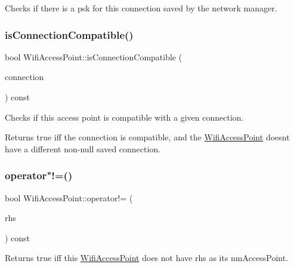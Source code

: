 Checks if there is a psk for this connection saved by the network manager. \mbox{\label{classWifiAccessPoint_ace8773ced0e39ecf90e5716e630cf066}} 
\subsubsection{\texorpdfstring{is\+Connection\+Compatible()}{isConnectionCompatible()}}
{\footnotesize\ttfamily bool Wifi\+Access\+Point\+::is\+Connection\+Compatible (\begin{DoxyParamCaption}\item[{N\+M\+Connection $\ast$}]{connection }\end{DoxyParamCaption}) const}

Checks if this access point is compatible with a given connection.

\begin{DoxyReturn}{Returns}
true iff the connection is compatible, and the \mbox{\hyperlink{classWifiAccessPoint}{Wifi\+Access\+Point}} doesn\textquotesingle{}t have a different non-\/null saved connection. 
\end{DoxyReturn}
\mbox{\label{classWifiAccessPoint_a966c77eedcf8093d7302a5803cbb345f}} 
\subsubsection{\texorpdfstring{operator"!=()}{operator!=()}\hspace{0.1cm}{\footnotesize\ttfamily [1/2]}}
{\footnotesize\ttfamily bool Wifi\+Access\+Point\+::operator!= (\begin{DoxyParamCaption}\item[{N\+M\+Access\+Point $\ast$}]{rhs }\end{DoxyParamCaption}) const}

Returns true iff this \mbox{\hyperlink{classWifiAccessPoint}{Wifi\+Access\+Point}} does not have rhs as its nm\+Access\+Point. \mbox{\label{classWifiAccessPoint_a7f814b369462c3a06b3bd4a7d68f0e20}} 
